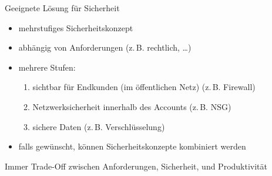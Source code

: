 \begin{flashcard}[\ ]{Geeignete Lösung für Sicherheit}
    \begin{itemize}
        \item mehrstufiges Sicherheitskonzept
        \item abhängig von Anforderungen (z.\,B. rechtlich, \ldots)
        \item mehrere Stufen:\newline
        \begin{enumerate}
            \item sichtbar für Endkunden (im öffentlichen Netz) (z.\,B. Firewall)
            \item Netzwerksicherheit innerhalb des Accounts (z.\,B. NSG)
            \item sichere Daten (z.\,B. Verschlüsselung)
        \end{enumerate}
        \item falls gewünscht, können Sicherheitskonzepte kombiniert werden
    \end{itemize}
    Immer Trade-Off zwischen Anforderungen, Sicherheit, und Produktivität
\end{flashcard}
